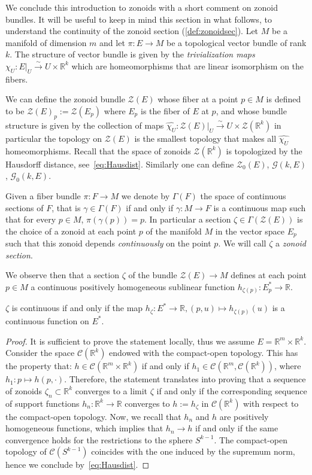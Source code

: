 \documentclass[AHL, Unicode, longabstracts, published]{cedram}
\newcommand{\R}{\mathbb{R}}
\newcommand{\ZZ}{\mathscr{Z}}
\newcommand{\ZZo}{\mathscr{Z}_0}
\newcommand{\mC}{\mathcal{C}}
\newcommand{\GZ}{\mathcal{G}}
\newcommand{\GZo}{\mathcal{G}_0}
\newcommand{\simto}{\overset{\sim}{\longrightarrow}}
\begin{document}
We conclude this introduction to zonoids with a short comment on zonoid bundles. It will be useful to keep in mind this section in what follows, to understand the continuity of the zonoid section (\cref{def:zonoidsec}). Let $M$ be a manifold of dimension $m$ and let $\pi:E\to M$ be a topological vector bundle of rank $k$. The structure of vector bundle is given by the \emph{trivialization maps} $\chi_U: E|_U\simto U\times \R^k$ which are homeomorphisms that are linear isomorphism on the fibers.

We can define the zonoid bundle $\ZZ(E)$ whose fiber at a point $p\in M$ is defined to be $\ZZ(E)_p:=\ZZ(E_p)$ where $E_p$ is the fiber of $E$ at $p$, and whose bundle structure is given by the collection of maps $\widehat{\chi_U}:\ZZ(E)|_U\simto U\times \ZZ(\R^k)$ in particular the topology on $\ZZ(E)$ is the smallest topology that makes all $\widehat{\chi_U}$ homeomorphisms. Recall that the space of zonoids $\ZZ(\R^k)$ is topologized by the Hausdorff distance, see~\eqref{eq:Hausdist}. Similarly one can define $\ZZo(E)$, $\GZ(k,E)$, $\GZo(k,E)$.


Given a fiber bundle $\pi:F\to M$ we denote by $\Gamma(F)$ the space of continuous sections of $F$, that is $\gamma\in\Gamma(F)$ if and only if $\gamma:M\to F$ is a continuous map such that for every $p\in M$, $\pi(\gamma(p))=p$. In particular a section $\zeta\in\Gamma(\ZZ(E))$ is the choice of a zonoid at each point $p$ of the manifold $M$ in the vector space $E_p$ such that this zonoid depends \emph{continuously} on the point $p$. We will call $\zeta$ a \emph{zonoid section}.

We observe then that a section $\zeta$ of the bundle $\ZZ(E)\to M$ defines at each point $p\in M$ a continuous positively homogeneous sublinear function $h_{\zeta(p)}:E_p^*\to \R$.

\begin{lemm}\label{lem:continuih}
$\zeta$ is continuous if and only if the map $h_{\zeta}:E^*\to\R, (p,u)\mapsto h_{\zeta(p)}(u)$ is a continuous function on $E^*$.
\end{lemm}

\begin{proof}
It is sufficient to prove the statement locally, thus we assume $E=\R^m\times \R^k$. Consider the space $\mC(\R^k)$ endowed with the compact-open topology. This has the property that: $h\in \mC(\R^m\times \R^k)$ if and only if $h_1\in \mC(\R^m,\mC(\R^k))$, where $h_1:p\mapsto h(p,\cdot)$. Therefore, the statement translates into proving that a sequence of zonoids $\zeta_n\subset \R^k$ converges to a limit $\zeta$ if and only if the corresponding sequence of support functions $h_n\colon \R^k\to \R$ converges to $h:=h_{\zeta}$ in $\mC(\R^k)$ with respect to the compact-open topology. Now, we recall that $h_n$ and $h$ are positively homogeneous functions, which implies that $h_n\to h$ if and only if the same convergence holds for the restrictions to the sphere $S^{k-1}$. The compact-open topology of $\mC(S^{k-1})$ coincides with the one induced by the supremum norm, hence we conclude by~\eqref{eq:Hausdist}.
\end{proof}
\end{document}
